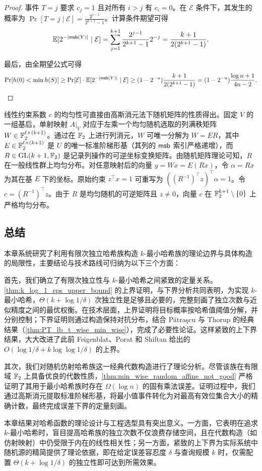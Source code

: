 \begin{proof}
    事件 $T = j$ 要求 $c_j = 1$ 且对所有 $i > j$ 有 $c_i = 0$。在 $\mathcal{E}$ 条件下，其发生的概率为 $\Pr[T = j \mid \mathcal{E}] = \frac{2^{j-1}}{2^{k+1}-1}$。计算条件期望可得
    $$
    \operatorname*{\mathbb{E}}[2^{-|\mathsf{msb}(Y)|} \mid \mathcal{E}] = \sum_{j=1}^{k+1} \frac{2^{j-1}}{2^{k+1}-1} 2^{-j} = \frac{k+1}{2(2^{k+1}-1)}.
    $$
    
    最后，由全期望公式可得
    $$
    \Pr[h(0) < \min h(S)] \ge \Pr[\mathcal{E}] \cdot \operatorname*{\mathbb{E}}[2^{-|\mathsf{msb}(Y)|} \mid \mathcal{E}] \ge (1 - 2^{-u}) \frac{k+1}{2(2^{k+1}-1)} = (1 - 2^{-u}) \frac{\log n + 1}{4 n - 2}.
    $$
\end{proof}

\begin{remark}\label{rmk:QR_induce_constraint_uniform}
    线性约束系数 $c$ 的均匀性可直接由高斯消元法下随机矩阵的性质得出。固定 $V$ 的一组基后，单射映射 $A|_V$ 对应于左乘一个均匀随机选取的列满秩矩阵 $W \in \mathbb{F}_2^{\ell \times (k+1)}$。通过在 $\mathbb{F}_2$ 上进行列消元，$W$ 可唯一分解为 $W = E R$，其中 $E \in \mathbb{F}_2^{\ell \times (k+1)}$ 是 $U$ 的唯一标准阶梯形基（其列的 $\mathsf{msb}$ 索引严格递增），而 $R \in \mathrm{GL}(k+1, \mathbb{F}_2)$ 是记录列操作的可逆坐标变换矩阵。由随机矩阵理论可知，$R$ 在一般线性群上均匀分布。对任意映射后的向量 $y = Wx = E(Rx)$，令 $\alpha = Rx$ 为其在基 $E$ 下的坐标。原始约束 $z^\top x = 1$ 可重写为 $((R^{-1})^\top z)^\top \alpha = 1$。令 $c = (R^{-1})^\top z$。由于 $R$ 是均匀随机的可逆矩阵且 $z \neq 0$，向量 $c$ 在 $\mathbb{F}_2^{k+1} \setminus \{0\}$ 上严格均匀分布。
\end{remark}

\subsection{总结}

本章系统研究了利用有限次独立哈希族构造 $k$-最小哈希族的理论边界与具体构造的局限性，主要结论与技术路线可归纳为以下三个方面：

首先，我们确立了有限次独立性与 $k$-最小哈希之间紧致的定量关系。\cref{thm:k_log_1_eps_upper_bound} 的上界证明，与下界分析共同表明，为实现 $k$-最小哈希，$\Theta(k + \log 1 / \delta)$ 次独立性是足够且必要的，完整刻画了独立次数与近似精度之间的最优权衡。在技术层面，上界证明将目标概率按哈希值阈值分解，并分别控制；下界证明则通过构造保持对抗分布，结合 P{\u{a}}tra{\c{s}}cu 与 Thorup \cite{PT_lb_t_wise_min_wise}的经典结果（\cref{thm:PT_lb_t_wise_min_wise}），完成了必要性论证。这样紧致的上下界结果，大大改进了此前 Feigenblat、Porat 和 Shiftan \cite{minwise_FPS11} 给出的 $O(\log 1 / \delta + k \log \log 1 / \delta)$ 的上界。

其次，我们对随机仿射哈希族这一经典代数构造进行了理论分析。尽管该族在有限域 $\mathbb{F}_2$ 上具备优良的代数性质，\cref{thm:min_wise_random_affine_not_good} 严格证明了其用于最小哈希族时存在 $\Omega(\log n)$ 的固有乘法误差。证明过程中，我们通过高斯消元提取标准阶梯形基，将最小值事件转化为对最高有效位集合大小的精确计数，最终完成误差下界的定量刻画。

本章结果对哈希函数的理论设计与工程选型具有突出意义。一方面，它表明在追求 $k$-最小哈希时，盲目提高哈希族的独立次数不仅浪费存储空间，且在代数构造（如仿射映射）中仍受限于内在的线性相关性；另一方面，紧致的上下界为实际系统中随机源的精简提供了理论依据，即在给定误差容忍度 $\delta$ 与查询规模 $k$ 时，仅需配置 $\Theta(k + \log 1 / \delta)$ 的独立性即可达到所需效果。